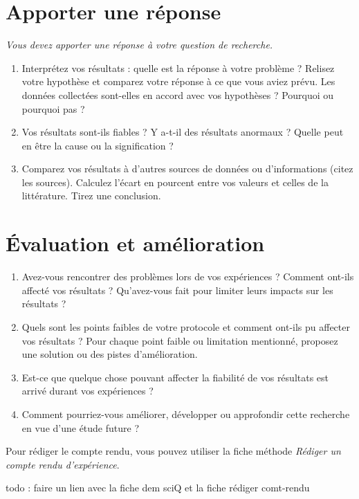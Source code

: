 \section{Apporter une réponse}

\textsl{Vous devez apporter une réponse à votre question de recherche.}


\begin{enumerate}
\item Interprétez vos résultats : quelle est la réponse à votre problème ? Relisez votre hypothèse et comparez votre réponse à ce que vous aviez prévu. Les données collectées sont-elles en accord avec vos hypothèses ? Pourquoi ou pourquoi pas ?

\item Vos résultats sont-ils fiables ? Y a-t-il des résultats anormaux ? Quelle peut en être la cause ou la signification ?

\item Comparez vos résultats à d'autres sources de données ou d'informations (citez les sources). Calculez l'écart en pourcent entre vos valeurs et celles de la littérature. Tirez une conclusion.

\end{enumerate}



\section{Évaluation et amélioration}

\begin{enumerate}
\item Avez-vous rencontrer des problèmes lors de vos expériences ? Comment ont-ils affecté vos résultats ? Qu'avez-vous fait pour limiter leurs impacts sur les résultats ?

\item Quels sont les points faibles de votre protocole et comment ont-ils pu affecter vos résultats ? Pour chaque point faible ou limitation mentionné, proposez une solution ou des pistes d'amélioration.

\item Est-ce que quelque chose pouvant affecter la fiabilité de vos résultats est arrivé durant vos expériences ?

\item Comment pourriez-vous améliorer, développer ou approfondir cette recherche en vue d'une étude future ?
\end{enumerate}

\vspace{1em}
Pour rédiger le compte rendu, vous pouvez utiliser la fiche méthode \emph{Rédiger un compte rendu d'expérience}. 

{\huge todo : faire un lien avec la fiche dem sciQ et la fiche rédiger comt-rendu}
